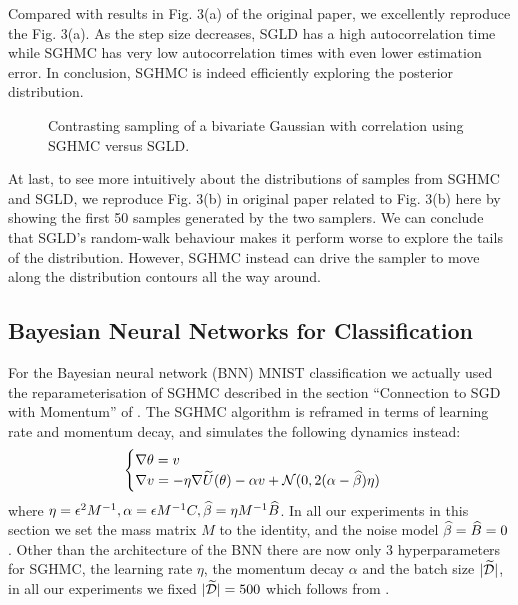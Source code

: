 Compared with results in Fig. 3(a) of the original paper, we excellently reproduce the Fig. 3(a). 
As the step size decreases, SGLD has a high autocorrelation time while SGHMC has very low autocorrelation times with even lower estimation error. In conclusion, SGHMC is indeed efficiently exploring the posterior distribution. 


\begin{figure}[htp] 
    \centering
    \hfill%
    \caption{Contrasting sampling of a bivariate Gaussian with correlation using SGHMC versus SGLD.}
\end{figure}

At last, to see more intuitively about the distributions of samples from SGHMC and SGLD, we reproduce Fig. 3(b) in original paper related to Fig. 3(b) here by showing the first 50 samples generated by the two samplers. We can conclude that SGLD's random-walk behaviour makes it perform worse to explore the tails of the distribution. However, SGHMC instead can drive the sampler to move along the distribution contours all the way around.





\subsection{Bayesian Neural Networks for Classification}
For the Bayesian neural network (BNN) MNIST classification we actually used the reparameterisation of SGHMC described in the section ``Connection to SGD with Momentum'' of \cite{sghmc}. The SGHMC algorithm is reframed in terms of learning rate and momentum decay, and simulates the following dynamics instead:
$$\begin{cases}
\nabla \theta = v\\
\nabla v = - \eta \nabla \widetilde{U}(\theta) - \alpha v + \mathcal{N}(0, 2(\alpha - \widehat{\beta}) \eta)
\end{cases}
$$
where $\eta = \epsilon^2 M^{-1}, \alpha = \epsilon M^{-1}C, \widehat{\beta} = \eta M^{-1}\widehat{B}$. In all our experiments in this section we set the mass matrix $M $ to the identity, and the noise model $\widehat{\beta} = \widehat{B} = 0$. Other than the architecture of the BNN there are now only 3 hyperparameters for SGHMC, the learning rate $\eta$, the momentum decay $\alpha$ and the batch size $|\widetilde{\mathcal{D}}|$, in all our experiments we fixed $|\widetilde{\mathcal{D}}| = 500$ which follows from \cite{sghmc}.

